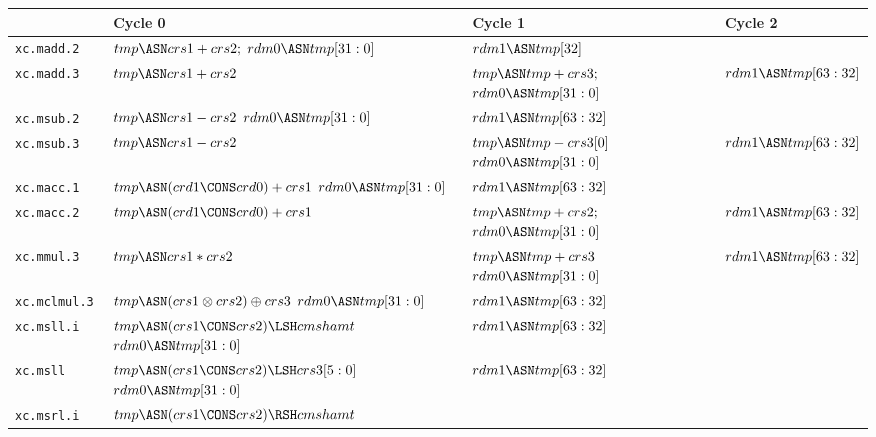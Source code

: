 \documentclass{scarv-report}
\begin{document}
\begin{table}[H]
\begin{tabularx}{\textwidth}{l Y Y Y }
\toprule
\textbf{}& \textbf{Cycle 0}& \textbf{Cycle 1}& \textbf{Cycle 2} \\
\midrule
{\tt xc.madd.2 }&
    $tmp \ASN crs1+crs2;$\newline 
    $rdm0\ASN tmp[31:0]$ 
 &  $rdm1\ASN tmp[32]$ 
 & \\
{\tt xc.madd.3 }&
   $tmp \ASN crs1 + crs2$
 & $tmp \ASN tmp + crs3;$\newline
   $rdm0\ASN tmp[31:0]$ 
 & $rdm1\ASN tmp[63:32]$ 
\\
{\tt xc.msub.2 }&
   $tmp \ASN crs1 - crs2$ \newline
   $rdm0\ASN tmp[31:0]$ 
 & $rdm1\ASN tmp[63:32]$ 
 &
\\
{\tt xc.msub.3 }&
   $tmp \ASN crs1 - crs2$ \newline
 &
   $tmp \ASN tmp - crs3[0]$ \newline
   $rdm0\ASN tmp[31:0]$ 
 & $rdm1\ASN tmp[63:32]$ 
\\
{\tt xc.macc.1 }&
    $tmp \ASN (crd1 \CONS crd0) + crs1$\newline 
    $rdm0\ASN tmp[31:0]$ 
 &  $rdm1\ASN tmp[63:32]$ 
 &
\\
{\tt xc.macc.2 }&
    $tmp \ASN (crd1 \CONS crd0) + crs1$\newline 
 &  $tmp \ASN tmp + crs2;$\newline 
    $rdm0\ASN tmp[31:0]$ 
 &  $rdm1\ASN tmp[63:32]$ 
\\
{\tt xc.mmul.3 }&
    $tmp \ASN crs1 * crs2$ \newline 
 &  
    $tmp \ASN tmp + crs3$\newline 
    $rdm0\ASN tmp[31:0]$ 
 &  $rdm1\ASN tmp[63:32]$ 
\\
{\tt xc.mclmul.3 }&
    $tmp \ASN (crs1 \otimes crs2) \oplus crs3$\newline 
    $rdm0\ASN tmp[31:0]$ 
 &  $rdm1\ASN tmp[63:32]$ 
 &  
\\
{\tt xc.msll.i }&
    $tmp \ASN (crs1 \CONS crs2) \LSH cmshamt$\newline 
    $rdm0\ASN tmp[31:0]$ 
 &  $rdm1\ASN tmp[63:32]$ 
 &
\\
{\tt xc.msll }&
    $tmp \ASN (crs1 \CONS crs2) \LSH crs3[5:0]$\newline 
    $rdm0\ASN tmp[31:0]$ 
 &  $rdm1\ASN tmp[63:32]$ 
 &
\\
{\tt xc.msrl.i }&
    $tmp \ASN (crs1 \CONS crs2) \RSH cmshamt$\newline 

\end{tabularx}
\end{table}
\end{document}
